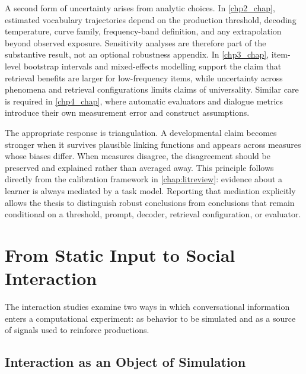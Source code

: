 A second form of uncertainty arises from analytic choices. In \cref{chp2_chap}, estimated vocabulary trajectories depend on the production threshold, decoding temperature, curve family, frequency-band definition, and any extrapolation beyond observed exposure. Sensitivity analyses are therefore part of the substantive result, not an optional robustness appendix. In \cref{chp3_chap}, item-level bootstrap intervals and mixed-effects modelling support the claim that retrieval benefits are larger for low-frequency items, while uncertainty across phenomena and retrieval configurations limits claims of universality. Similar care is required in \cref{chp4_chap}, where automatic evaluators and dialogue metrics introduce their own measurement error and construct assumptions.

The appropriate response is triangulation. A developmental claim becomes stronger when it survives plausible linking functions and appears across measures whose biases differ. When measures disagree, the disagreement should be preserved and explained rather than averaged away. This principle follows directly from the calibration framework in \cref{chap:litreview}: evidence about a learner is always mediated by a task model. Reporting that mediation explicitly allows the thesis to distinguish robust conclusions from conclusions that remain conditional on a threshold, prompt, decoder, retrieval configuration, or evaluator.

\section{From Static Input to Social Interaction}
\label{sec:gd_interaction}

The interaction studies examine two ways in which conversational information enters a computational experiment: as behavior to be simulated and as a source of signals used to reinforce productions.

\subsection{Interaction as an Object of Simulation}

